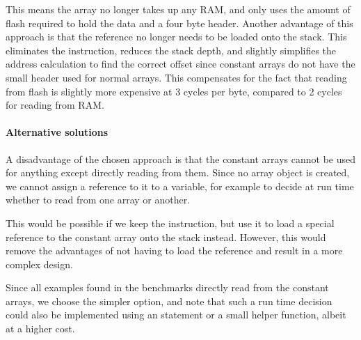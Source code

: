 This means the array no longer takes up any RAM, and only uses the amount of flash required to hold the data and a four byte header. Another advantage of this approach is that the reference no longer needs to be loaded onto the stack. This eliminates the  instruction, reduces the stack depth, and slightly simplifies the address calculation to find the correct offset since constant arrays do not have the small header used for normal arrays. This compensates for the fact that reading from flash is slightly more expensive at 3 cycles per byte, compared to 2 cycles for reading from RAM. 

\paragraph{Alternative solutions}
A disadvantage of the chosen approach is that the constant arrays cannot be used for anything except directly reading from them. Since no array object is created, we cannot assign a reference to it to a variable, for example to decide at run time whether to read from one array or another.

This would be possible if we keep the  instruction, but use it to load a special reference to the constant array onto the stack instead. However, this would remove the advantages of not having to load the reference and result in a more complex design.

Since all examples found in the benchmarks directly read from the constant arrays, we choose the simpler option, and note that such a run time decision could also be implemented using an  statement or a small helper function, albeit at a higher cost. 
